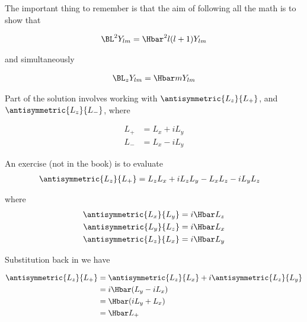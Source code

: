 The important thing to remember is that the aim of following all the math is to show that

\begin{equation}\label{eqn:lecture5BigReviewAngularMomentum:5300}
\begin{aligned}
\BL^2 Y_{lm} = \Hbar^2 l (l+1) Y_{lm}
\end{aligned}
\end{equation}

and simultaneously

\begin{equation}\label{eqn:lecture5BigReviewAngularMomentum:5320}
\begin{aligned}
\BL_z Y_{lm} = \Hbar m Y_{lm}
\end{aligned}
\end{equation}

Part of the solution involves working with \(\antisymmetric{L_z}{L_{+}}\), and \(\antisymmetric{L_z}{L_{-}}\), where

\begin{equation}\label{eqn:lecture5BigReviewAngularMomentum:5340}
\begin{aligned}
L_{+} &= L_x + i L_y \\
L_{-} &= L_x - i L_y
\end{aligned}
\end{equation}

An exercise (not in the book) is to evaluate
\begin{equation}\label{eqn:PHY356F:4000}
\begin{aligned}
\antisymmetric{L_z}{L_{+}}
&= L_z L_x + i L_z L_y - L_x L_z - i L_y L_z
\end{aligned}
\end{equation}

where
\begin{equation}\label{eqn:PHY356F:5000}
\begin{aligned}
\antisymmetric{L_x}{L_y}  &= i \Hbar L_z \\
\antisymmetric{L_y}{L_z}  &= i \Hbar L_x \\
\antisymmetric{L_z}{L_x}  &= i \Hbar L_y
\end{aligned}
\end{equation}

Substitution back in  we have

\begin{equation}\label{eqn:lecture5BigReviewAngularMomentum:5360}
\begin{aligned}
\antisymmetric{L_z}{L_{+}}
&=
\antisymmetric{L_z}{L_x}
+ i \antisymmetric{L_z}{L_y}  \\
&=
i \Hbar ( L_y - i L_x ) \\
&=
\Hbar ( i L_y +  L_x ) \\
&=
\Hbar L_{+}
\end{aligned}
\end{equation}
